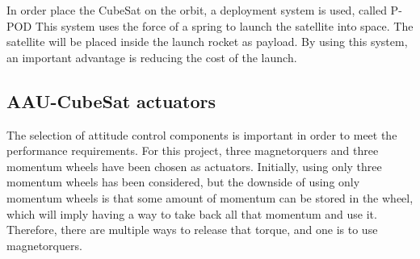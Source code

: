 In order place the CubeSat on the orbit, a deployment system is used, called P-POD  This system uses the force of a spring to launch the satellite into space. The satellite will be placed inside the launch rocket as payload. By using this system, an important advantage is reducing the cost of the launch.
%
\subsection{AAU-CubeSat actuators}
The selection of attitude control components is important in order to meet the performance requirements. For this project, three magnetorquers and three momentum wheels have been chosen as actuators. Initially, using only three momentum wheels has been considered, but the downside of using only momentum wheels is that some amount of momentum can be stored in the wheel, which will imply having a way to take back all that momentum and use it. Therefore, there are multiple ways to release that torque, and one is to use magnetorquers. 

